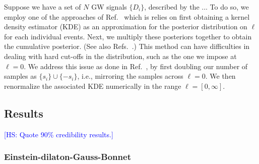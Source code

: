 \documentclass[twocolumn,prd,aps,superscriptaddress,preprintnumbers,tightenlines,showpacs,nofootinbib,amsfonts,amsmath,longbibliography]{revtex4-1}
\newcommand{\hs}[1]{{\textcolor{blue}{{[HS: #1]}} }}
\begin{document}
Suppose we have a set of $N$ GW signals $\{D_{i}\}$, described by the ...
%
%
To do so, we employ one of the approaches of Ref.~\cite{Perkins:2021mhb} which
is relies on first obtaining a kernel density estimator (KDE) as an approximation for
the posterior distribution on $\ell$ for each individual events. Next, we multiply
these posteriors together to obtain the cumulative posterior.
%
(See also Refs.~\cite{DelPozzo:2011pg,Cardenas-Avendano:2019zxd,Carullo:2021dui}.)
%
This method can have difficulties in dealing with hard cut-offs in the
distribution, such as the one we impose at $\ell = 0$. We address this issue as
done in Ref.~\cite{Perkins:2021mhb}, by first doubling our number of samples as
$\{ s_i \} \cup \{ - s_i \}$, i.e., mirroring the samples across $\ell = 0$.
%
We then renormalize the associated KDE numerically in the range $\ell = [0,
\infty]$.

\subsection{Results}

\hs{Quote 90\% credibility results.}




\subsubsection{Einstein-dilaton-Gauss-Bonnet}
\label{sec:results_edgb}
\end{document}
